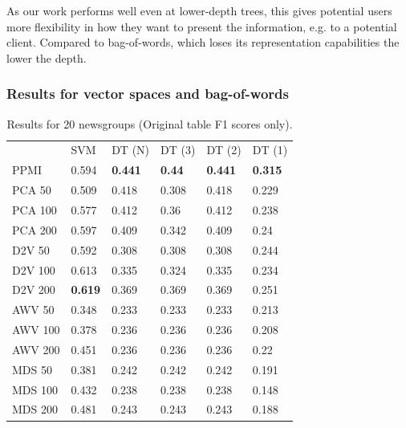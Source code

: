 As our work performs well even at lower-depth trees, this gives potential users more flexibility in how they want to present the information, e.g. to a potential client. Compared to bag-of-words, which loses its representation capabilities the lower the depth.

\subsubsection{Results for vector spaces and bag-of-words}
\begin{table}[]
	\begin{tabular}{llllll}
		& SVM   & DT (N) & DT (3) & DT (2) & DT (1) \\
		PPMI           & 0.594 & \textbf{0.441}  & \textbf{0.44}   & \textbf{0.441}  & \textbf{0.315}  \\
		PCA 50         & 0.509 & 0.418  & 0.308  & 0.418  & 0.229  \\
		PCA 100        & 0.577 & 0.412  & 0.36   & 0.412  & 0.238  \\
		PCA 200        & 0.597 & 0.409  & 0.342  & 0.409  & 0.24   \\
		D2V 50         & 0.592 & 0.308  & 0.308  & 0.308  & 0.244  \\
		D2V 100        & 0.613 & 0.335  & 0.324  & 0.335  & 0.234  \\
		D2V 200        & \textbf{0.619} & 0.369  & 0.369  & 0.369  & 0.251  \\
		AWV 50         & 0.348 & 0.233  & 0.233  & 0.233  & 0.213  \\
		AWV 100        & 0.378 & 0.236  & 0.236  & 0.236  & 0.208  \\
		AWV 200        & 0.451 & 0.236  & 0.236  & 0.236  & 0.22   \\
		MDS 50         & 0.381 & 0.242  & 0.242  & 0.242  & 0.191  \\
		MDS 100        & 0.432 & 0.238  & 0.238  & 0.238  & 0.148  \\
		MDS 200        & 0.481 & 0.243  & 0.243  & 0.243  & 0.188 
	\end{tabular}
	\caption{Results for 20 newsgroups (Original table F1 scores only).}
	\label{table:Newsgroups}
\end{table}

